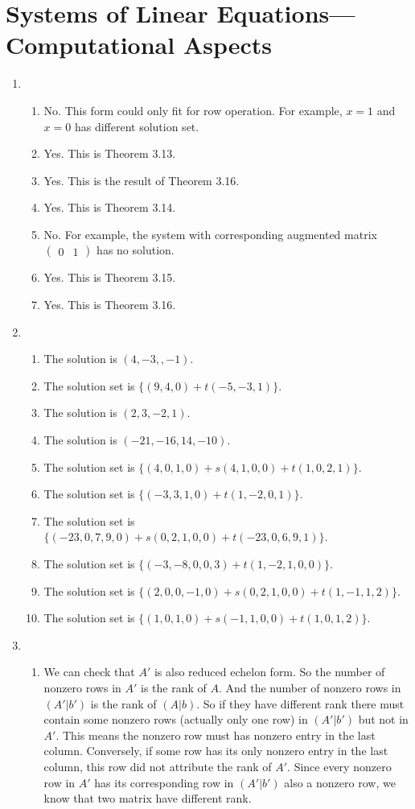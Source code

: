 \section{Systems of Linear Equations---Computational Aspects}
\begin{enumerate}
\item \begin{enumerate}
\item No. This form could only fit for row operation. For example, $x=1$ and $x=0$ has different solution set.
\item Yes. This is Theorem 3.13.
\item Yes. This is the result of Theorem 3.16.
\item Yes. This is Theorem 3.14.
\item No. For example, the system with corresponding augmented matrix $\left(\begin{array}{c|c}0&1 \end{array}\right)$ has no solution.
\item Yes. This is Theorem 3.15.
\item Yes. This is Theorem 3.16.
\end{enumerate}
\item \begin{enumerate}
\item The solution is $(4,-3,,-1)$.
\item The solution set is $\{(9,4,0)+t(-5,-3,1)\}$.
\item The solution is $(2,3,-2,1)$.
\item The solution is $(-21,-16,14,-10)$.
\item The solution set is $\{(4,0,1,0)+s(4,1,0,0)+t(1,0,2,1)\}$.
\item The solution set is $\{(-3,3,1,0)+t(1,-2,0,1)\}$.
\item The solution set is $\{(-23,0,7,9,0)+s(0,2,1,0,0)+t(-23,0,6,9,1)\}$.
\item The solution set is $\{(-3,-8,0,0,3)+t(1,-2,1,0,0)\}$.
\item The solution set is $\{(2,0,0,-1,0)+s(0,2,1,0,0)+t(1,-1,1,2)\}$.
\item The solution set is $\{(1,0,1,0)+s(-1,1,0,0)+t(1,0,1,2)\}$.
\end{enumerate}
\item \begin{enumerate}
\item We can check that $A'$ is also reduced echelon form. So the number of nonzero rows in $A'$ is the rank of $A$. And the number of nonzero rows in $(A'|b')$ is the rank of $(A|b)$. So if they have different rank there must contain some nonzero rows (actually only one row) in $(A'|b')$ but not in $A'$. This means the nonzero row must has nonzero entry in the last column. Conversely, if some row has its only nonzero entry in the last column, this row did not attribute the rank of $A'$. Since every nonzero row in $A'$ has its corresponding row in $(A'|b')$ also a nonzero row, we know that two matrix have different rank.

\end{enumerate}
\end{enumerate}
